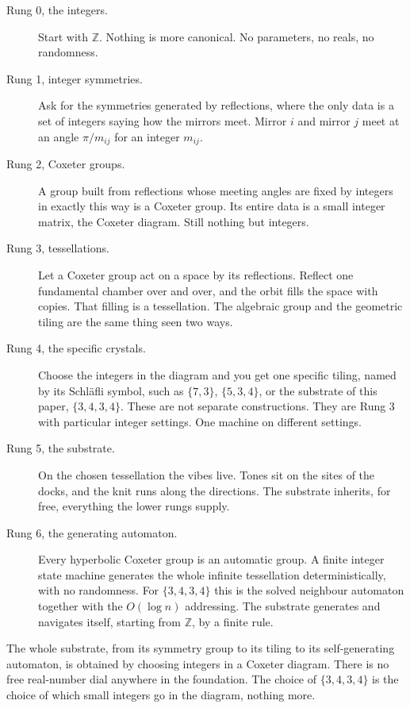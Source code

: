\begin{description}
\item[Rung 0, the integers.] Start with $\mathbb{Z}$. Nothing is more canonical. No parameters, no reals, no randomness.
\item[Rung 1, integer symmetries.] Ask for the symmetries generated by reflections, where the only data is a set of integers saying how the mirrors meet. Mirror $i$ and mirror $j$ meet at an angle $\pi / m_{ij}$ for an integer $m_{ij}$.
\item[Rung 2, Coxeter groups.] A group built from reflections whose meeting angles are fixed by integers in exactly this way is a Coxeter group. Its entire data is a small integer matrix, the Coxeter diagram. Still nothing but integers.
\item[Rung 3, tessellations.] Let a Coxeter group act on a space by its reflections. Reflect one fundamental chamber over and over, and the orbit fills the space with copies. That filling is a tessellation. The algebraic group and the geometric tiling are the same thing seen two ways.
\item[Rung 4, the specific crystals.] Choose the integers in the diagram and you get one specific tiling, named by its Schl\"afli symbol, such as $\{7,3\}$, $\{5,3,4\}$, or the substrate of this paper, $\{3,4,3,4\}$. These are not separate constructions. They are Rung 3 with particular integer settings. One machine on different settings.
\item[Rung 5, the substrate.] On the chosen tessellation the vibes live. Tones sit on the sites of the docks, and the knit runs along the directions. The substrate inherits, for free, everything the lower rungs supply.
\item[Rung 6, the generating automaton.] Every hyperbolic Coxeter group is an automatic group. A finite integer state machine generates the whole infinite tessellation deterministically, with no randomness. For $\{3,4,3,4\}$ this is the solved neighbour automaton together with the $O(\log n)$ addressing. The substrate generates and navigates itself, starting from $\mathbb{Z}$, by a finite rule.
\end{description}

\begin{result}
The whole substrate, from its symmetry group to its tiling to its self-generating automaton, is obtained by choosing integers in a Coxeter diagram. There is no free real-number dial anywhere in the foundation. The choice of $\{3,4,3,4\}$ is the choice of which small integers go in the diagram, nothing more.
\end{result}

